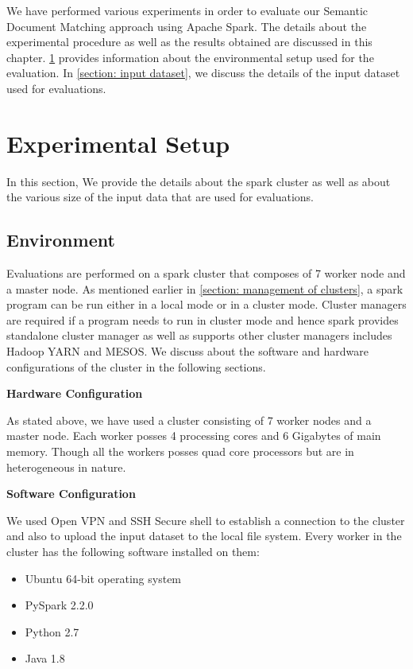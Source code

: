 \label{evaluation}
We have performed various experiments in order to evaluate our Semantic Document Matching approach using Apache Spark. The details about the experimental procedure as well as the results obtained are discussed in this chapter. \ref{Section: Experimental Setup} provides information about the environmental setup used for the evaluation. In \ref{section: input dataset}, we discuss the details of the input dataset used for evaluations.

\section{Experimental Setup}
\label{Section: Experimental Setup}

In this section, We provide the details about the spark cluster as well as about the various size of the input data that are used for evaluations.

\subsection{Environment}

Evaluations are performed on a spark cluster that composes of 7 worker node and a master node. As mentioned earlier in \ref{section: management of clusters}, a spark program can be run either in a local mode or in a cluster mode. Cluster managers are required if a program needs to run in cluster mode and hence spark provides standalone cluster manager as well as supports other cluster managers includes Hadoop YARN and MESOS. We discuss about the software and hardware configurations of the cluster in the following sections.

\textbf{Hardware Configuration} 
\par As stated above, we have used a cluster consisting of 7 worker nodes and a master node. Each worker posses 4 processing cores and 6 Gigabytes of main memory. Though all the workers posses quad core processors but are in heterogeneous in nature. 

\textbf{Software Configuration}
\par We used Open VPN and SSH Secure shell to establish a connection to the cluster and also to upload the input dataset to the local file system. Every worker in the cluster has the following software installed on them:
\begin{itemize}
\item Ubuntu 64-bit operating system
\item PySpark 2.2.0
\item Python 2.7
\item Java 1.8
\end{itemize}


